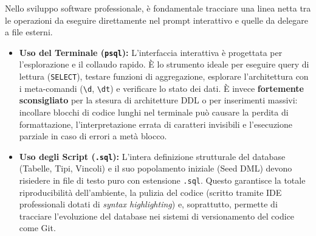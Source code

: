\begin{bestpractice}
Nello sviluppo software professionale, è fondamentale tracciare una linea netta tra le operazioni da eseguire direttamente nel prompt interattivo e quelle da delegare a file esterni.

\begin{itemize}
    \item \textbf{Uso del Terminale (\texttt{psql}):} L'interfaccia interattiva è progettata per l'esplorazione e il collaudo rapido. È lo strumento ideale per eseguire query di lettura (\texttt{SELECT}), testare funzioni di aggregazione, esplorare l'architettura con i meta-comandi (\texttt{\textbackslash d}, \texttt{\textbackslash dt}) e verificare lo stato dei dati. È invece \textbf{fortemente sconsigliato} per la stesura di architetture DDL o per inserimenti massivi: incollare blocchi di codice lunghi nel terminale può causare la perdita di formattazione, l'interpretazione errata di caratteri invisibili e l'esecuzione parziale in caso di errori a metà blocco.
    
    \item \textbf{Uso degli Script (\texttt{.sql}):} L'intera definizione strutturale del database (Tabelle, Tipi, Vincoli) e il suo popolamento iniziale (Seed DML) devono risiedere in file di testo puro con estensione \texttt{.sql}. Questo garantisce la totale riproducibilità dell'ambiente, la pulizia del codice (scritto tramite IDE professionali dotati di \textit{syntax highlighting}) e, soprattutto, permette di tracciare l'evoluzione del database nei sistemi di versionamento del codice come Git.
\end{itemize}
\end{bestpractice}

